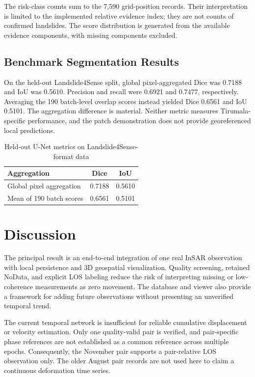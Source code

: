 \documentclass[conference]{IEEEtran}
\begin{document}
The risk-class counts sum to the 7,590 grid-position records. Their
interpretation is limited to the implemented relative evidence index; they
are not counts of confirmed landslides. The score distribution is generated
from the available evidence components, with missing components excluded.

\subsection{Benchmark Segmentation Results}
On the held-out Landslide4Sense split, global pixel-aggregated Dice was 0.7188
and IoU was 0.5610. Precision and recall were 0.6921 and 0.7477,
respectively. Averaging the 190 batch-level overlap scores instead yielded
Dice 0.6561 and IoU 0.5101. The aggregation difference is material. Neither
metric measures Tirumala-specific performance, and the patch demonstration
does not provide georeferenced local predictions.

\begin{table}[t]
\caption{Held-out U-Net metrics on Landslide4Sense-format data}
\label{tab:unet}
\centering
\footnotesize
\begin{tabular}{lcc}
\toprule
\textbf{Aggregation} & \textbf{Dice} & \textbf{IoU}\\
\midrule
Global pixel aggregation & 0.7188 & 0.5610\\
Mean of 190 batch scores & 0.6561 & 0.5101\\
\bottomrule
\end{tabular}
\end{table}

\section{Discussion}
The principal result is an end-to-end integration of one real InSAR
observation with local persistence and 3D geospatial visualization. Quality
screening, retained NoData, and explicit LOS labeling reduce the risk of
interpreting missing or low-coherence measurements as zero movement.
The database and viewer also provide a framework for adding future
observations without presenting an unverified temporal trend.

The current temporal network is insufficient for reliable cumulative
displacement or velocity estimation. Only one quality-valid pair is verified,
and pair-specific phase references are not established as a common reference
across multiple epochs. Consequently, the November pair supports a
pair-relative LOS observation only. The older August pair records are not
used here to claim a continuous deformation time series.
\end{document}

